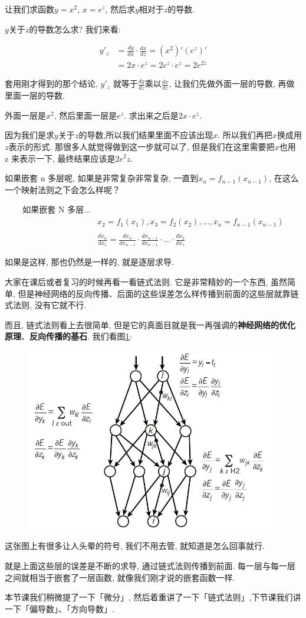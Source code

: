 让我们求函数$y=x^2$, $x=e^z$, 然后求$y$相对于$z$的导数. 

$y$关于$z$的导数怎么求? 我们来看:

\begin{align*}
  y'_z & = \frac{dy}{dx} \cdot \frac{dx}{dz} = (x^2)'(e^z)' \\
  & = 2x \cdot e^z = 2e^z \cdot e^z = 2e^{2z}
\end{align*}


套用刚才得到的那个结论, $y'_z$ 就等于$\frac{dy}{dz}$乘以$\frac{dx}{dz}$, 让我们先做外面一层的导数, 再做里面一层的导数. 

外面一层是$x^2$, 然后里面一层是$e^z$. 求出来之后是$2x\cdot e^z$. 

因为我们是求$y$关于$z$的导数,所以我们结果里面不应该出现$x$. 所以我们再把$x$换成用$z$表示的形式. 那很多人就觉得做到这一步就可以了, 但是我们在这里需要把$x$也用 z 来表示一下, 最终结果应该是$2e^2z$. 

如果嵌套 n 多层呢, 如果是非常复杂非常复杂, 一直到$x_n = f_{n-1}(x_{n-1})$, 在这么一个映射法则之下会怎么样呢？ 

\begin{align*}
  \mbox{如果嵌套 N 多层...} & \\
  & x_2 = f_1(x_1), x_3 = f_2(x_2), ..., x_n = f_{n-1}(x_{n-1}) \\ \\
  & \frac{dx_n}{dx_1} = \frac{dx_n}{dx_{n-1}} \cdot \frac{dx_{n-1}}{dx_{n-1}} \cdot ... \cdot \frac{dx_2}{dx_1}
\end{align*}

如果是这样, 那也仍然是一样的, 就是逐层求导. 

大家在课后或者复习的时候再看一看链式法则. 它是非常精妙的一个东西, 虽然简单, 但是神经网络的反向传播、后面的这些误差怎么样传播到前面的这些层就靠链式法则, 没有它就不行. 

而且, 链式法则看上去很简单, 但是它的真面目就是我一再强调的\textbf{神经网络的优化原理}、\textbf{反向传播的基石}. 我们看图\ref{fig:img11_1}:

\begin{figure}[ht]
  \centering
  \includegraphics[width=0.8\linewidth]{asset/20200603174921-1878265324_jpeg_759_542_46786.jpg}
  \caption{}
  \label{fig:img11_1}
\end{figure}

这张图上有很多让人头晕的符号, 我们不用去管, 就知道是怎么回事就行. 

就是上面这些层的误差是不断的求导, 通过链式法则传播到前面. 每一层与每一层之间就相当于嵌套了一层函数, 就像我们刚才说的嵌套函数一样. 

本节课我们稍微提了一下「微分」, 然后着重讲了一下「链式法则」,下节课我们讲一下「偏导数」、「方向导数」. 